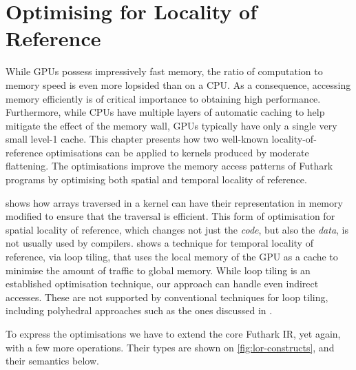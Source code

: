 \chapter{Optimising for Locality of Reference}
\label{chap:tiling}

While GPUs possess impressively fast memory, the ratio of computation
to memory speed is even more lopsided than on a CPU.  As a
consequence, accessing memory efficiently is of critical importance to
obtaining high performance.  Furthermore, while CPUs have multiple
layers of automatic caching to help mitigate the effect of the memory
wall, GPUs typically have only a single very small level-1 cache.
This chapter presents how two well-known locality-of-reference
optimisations can be applied to kernels produced by moderate
flattening.  The optimisations improve the memory access patterns of
Futhark programs by optimising both spatial and temporal locality of
reference.

 shows how arrays traversed in a kernel
can have their representation in memory modified to ensure that the
traversal is efficient.  This form of optimisation for spatial
locality of reference, which changes not just the \textit{code}, but
also the \textit{data}, is not usually used by compilers.
 shows a technique for temporal locality of
reference, via loop tiling, that uses the local memory of the GPU as a
cache to minimise the amount of traffic to global memory.  While loop
tiling is an established optimisation technique, our approach can
handle even indirect accesses.  These are not supported by
conventional techniques for loop tiling, including polyhedral
approaches such as the ones discussed in
\cite{chatarasi2015polyhedral}.

To express the optimisations we have to extend the core Futhark IR,
yet again, with a few more operations.  Their types are shown on
\cref{fig:lor-constructs}, and their semantics below.

